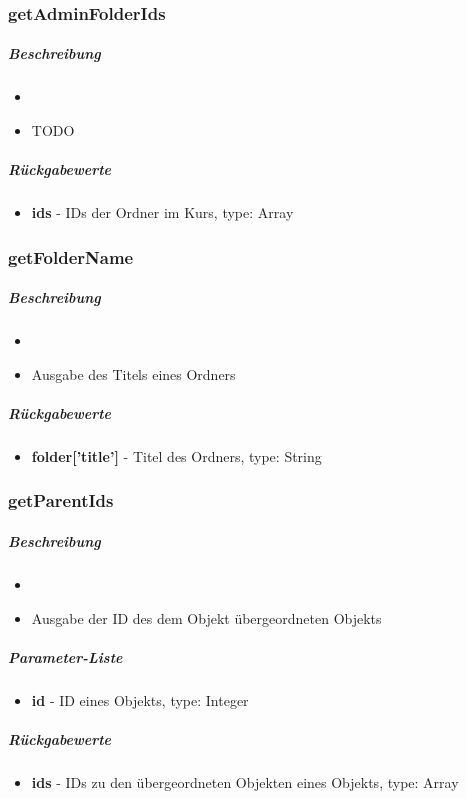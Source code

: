 \subsubsection*{getAdminFolderIds}\label{getAdminFolderIdsLGUI}
\subparagraph{Beschreibung}
\begin{itemize}
	\item[] \noindent{} 
	\item[] TODO
\end{itemize}
\subparagraph{Rückgabewerte}
\begin{itemize}
	\item[] \textbf{ids} - IDs der Ordner im Kurs, type: Array
\end{itemize}

\subsubsection*{getFolderName}\label{getFolderNameLGUI}
\subparagraph{Beschreibung}
\begin{itemize}
	\item[] \noindent{} 
	\item[] Ausgabe des Titels eines Ordners
\end{itemize}
\subparagraph{Rückgabewerte}
\begin{itemize}
	\item[] \textbf{folder['title']} - Titel des Ordners, type: String 
\end{itemize}

\subsubsection*{getParentIds}\label{getParentIdsLGUI}
\subparagraph{Beschreibung}
\begin{itemize}
	\item[] \noindent{} 
	\item[] Ausgabe der ID des dem Objekt übergeordneten Objekts
\end{itemize}
\subparagraph{Parameter-Liste}
\begin{itemize}
	\item[] \textbf{id} - ID eines Objekts, type: Integer 
\end{itemize}
\subparagraph{Rückgabewerte}
\begin{itemize}
	\item[] \textbf{ids} - IDs zu den übergeordneten Objekten eines Objekts, type: Array
\end{itemize}

